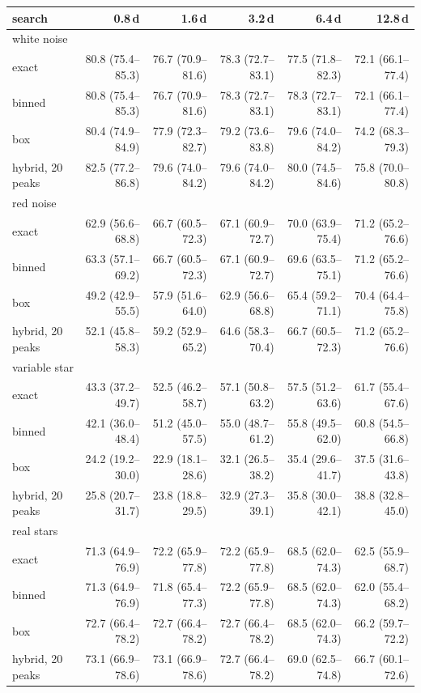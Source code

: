 \begin{tabular}{lrrrrr}
\toprule
search & 0.8\,d & 1.6\,d & 3.2\,d & 6.4\,d & 12.8\,d \\
\midrule
\multicolumn{6}{l}{white noise} \\
exact & 80.8 (75.4--85.3) & 76.7 (70.9--81.6) & 78.3 (72.7--83.1) & 77.5 (71.8--82.3) & 72.1 (66.1--77.4) \\
binned & 80.8 (75.4--85.3) & 76.7 (70.9--81.6) & 78.3 (72.7--83.1) & 78.3 (72.7--83.1) & 72.1 (66.1--77.4) \\
box & 80.4 (74.9--84.9) & 77.9 (72.3--82.7) & 79.2 (73.6--83.8) & 79.6 (74.0--84.2) & 74.2 (68.3--79.3) \\
hybrid, 20 peaks & 82.5 (77.2--86.8) & 79.6 (74.0--84.2) & 79.6 (74.0--84.2) & 80.0 (74.5--84.6) & 75.8 (70.0--80.8) \\
\midrule
\multicolumn{6}{l}{red noise} \\
exact & 62.9 (56.6--68.8) & 66.7 (60.5--72.3) & 67.1 (60.9--72.7) & 70.0 (63.9--75.4) & 71.2 (65.2--76.6) \\
binned & 63.3 (57.1--69.2) & 66.7 (60.5--72.3) & 67.1 (60.9--72.7) & 69.6 (63.5--75.1) & 71.2 (65.2--76.6) \\
box & 49.2 (42.9--55.5) & 57.9 (51.6--64.0) & 62.9 (56.6--68.8) & 65.4 (59.2--71.1) & 70.4 (64.4--75.8) \\
hybrid, 20 peaks & 52.1 (45.8--58.3) & 59.2 (52.9--65.2) & 64.6 (58.3--70.4) & 66.7 (60.5--72.3) & 71.2 (65.2--76.6) \\
\midrule
\multicolumn{6}{l}{variable star} \\
exact & 43.3 (37.2--49.7) & 52.5 (46.2--58.7) & 57.1 (50.8--63.2) & 57.5 (51.2--63.6) & 61.7 (55.4--67.6) \\
binned & 42.1 (36.0--48.4) & 51.2 (45.0--57.5) & 55.0 (48.7--61.2) & 55.8 (49.5--62.0) & 60.8 (54.5--66.8) \\
box & 24.2 (19.2--30.0) & 22.9 (18.1--28.6) & 32.1 (26.5--38.2) & 35.4 (29.6--41.7) & 37.5 (31.6--43.8) \\
hybrid, 20 peaks & 25.8 (20.7--31.7) & 23.8 (18.8--29.5) & 32.9 (27.3--39.1) & 35.8 (30.0--42.1) & 38.8 (32.8--45.0) \\
\midrule
\multicolumn{6}{l}{real stars} \\
exact & 71.3 (64.9--76.9) & 72.2 (65.9--77.8) & 72.2 (65.9--77.8) & 68.5 (62.0--74.3) & 62.5 (55.9--68.7) \\
binned & 71.3 (64.9--76.9) & 71.8 (65.4--77.3) & 72.2 (65.9--77.8) & 68.5 (62.0--74.3) & 62.0 (55.4--68.2) \\
box & 72.7 (66.4--78.2) & 72.7 (66.4--78.2) & 72.7 (66.4--78.2) & 68.5 (62.0--74.3) & 66.2 (59.7--72.2) \\
hybrid, 20 peaks & 73.1 (66.9--78.6) & 73.1 (66.9--78.6) & 72.7 (66.4--78.2) & 69.0 (62.5--74.8) & 66.7 (60.1--72.6) \\
\bottomrule
\end{tabular}

